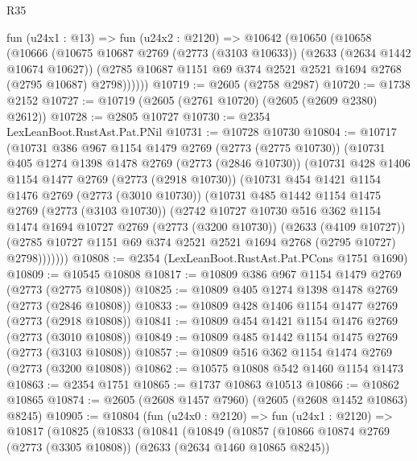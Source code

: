\begin{lexlean}{R35}
\begin{coremodule}
    fun (u24x1 : @13) =>
    fun (u24x2 : @2120) =>
    @10642
      (@10650
        (@10658
          (@10666
            (@10675
              @10687
              @2769
              (@2773 (@3103 @10633))
              (@2633 (@2634 @1442 @10674 @10627))
              (@2785 @10687 @1151 @69 @374 @2521 @2521 @1694 @2768 (@2795 @10687) @2798))))))
@10719 := @2605 (@2758 @2987)
@10720 := @1738 @2152
@10727 := @10719 (@2605 (@2761 @10720) (@2605 (@2609 @2380) @2612))
@10728 := @2805 @10727
@10730 := @2354 LexLeanBoot.RustAst.Pat.PNil
@10731 := @10728 @10730
@10804 := @10717
    (@10731
      @386
      @967
      @1154
      @1479
      @2769
      (@2773 (@2775 @10730))
      (@10731
        @405
        @1274
        @1398
        @1478
        @2769
        (@2773 (@2846 @10730))
        (@10731
          @428
          @1406
          @1154
          @1477
          @2769
          (@2773 (@2918 @10730))
          (@10731
            @454
            @1421
            @1154
            @1476
            @2769
            (@2773 (@3010 @10730))
            (@10731
              @485
              @1442
              @1154
              @1475
              @2769
              (@2773 (@3103 @10730))
              (@2742
                @10727
                @10730
                @516
                @362
                @1154
                @1474
                @1694
                @10727
                @2769
                (@2773 (@3200 @10730))
                (@2633 (@4109 @10727))
                (@2785 @10727 @1151 @69 @374 @2521 @2521 @1694 @2768 (@2795 @10727) @2798)))))))
@10808 := @2354 (LexLeanBoot.RustAst.Pat.PCons @1751 @1690)
@10809 := @10545 @10808
@10817 := @10809 @386 @967 @1154 @1479 @2769 (@2773 (@2775 @10808))
@10825 := @10809 @405 @1274 @1398 @1478 @2769 (@2773 (@2846 @10808))
@10833 := @10809 @428 @1406 @1154 @1477 @2769 (@2773 (@2918 @10808))
@10841 := @10809 @454 @1421 @1154 @1476 @2769 (@2773 (@3010 @10808))
@10849 := @10809 @485 @1442 @1154 @1475 @2769 (@2773 (@3103 @10808))
@10857 := @10809 @516 @362 @1154 @1474 @2769 (@2773 (@3200 @10808))
@10862 := @10575 @10808 @542 @1460 @1154 @1473
@10863 := @2354 @1751
@10865 := @1737 @10863 @10513
@10866 := @10862 @10865
@10874 := @2605 (@2608 @1457 @7960) (@2605 (@2608 @1452 @10863) @8245)
@10905 := @10804
    (fun (u24x0 : @2120) =>
    fun (u24x1 : @2120) =>
    @10817
      (@10825
        (@10833
          (@10841
            (@10849
              (@10857
                (@10866
                  @10874
                  @2769
                  (@2773 (@3305 @10808))
                  (@2633 (@2634 @1460 @10865 @8245))

\end{coremodule}
\end{lexlean}
